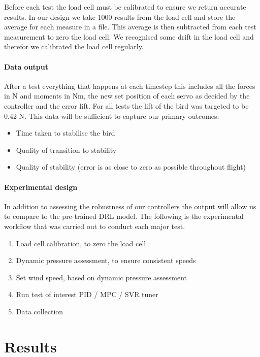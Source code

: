     Before each test the load cell must be calibrated to ensure we return
    accurate results. In our design we take 1000 results from the load cell
    and store the average for each measure in a file. This average is then
    subtracted from each test measurement to zero the load cell. We recognised
    some drift in the load cell and therefor we calibrated the load cell regularly.

    \paragraph{Data output}
    After a test everything that happens at each timestep this includes all the
    forces in N and moments in Nm, the new set position of each servo as decided by
    the controller and the error lift. For all tests the lift of the bird was
    targeted to be 0.42 N. This data will be sufficient to capture our primary outcomes:

    \begin{itemize}
        \item Time taken to stabilise the bird
        \item Quality of transition to stability
        \item Quality of stability (error is as close to zero as possible throughout flight)
    \end{itemize}

    \paragraph{Experimental design} In addition to assessing the robustness of our controllers the output will
    allow us to compare to the pre-trained DRL model.
    The following is the experimental workflow that was carried out to conduct each major test.

    \begin{enumerate}
        \item Load cell calibration, to zero the load cell
        \item Dynamic pressure assessment, to ensure consistent speeds
        \item Set wind speed, based on dynamic pressure assessment
        \item Run test of interest PID / MPC / SVR tuner
        \item Data collection
    \end{enumerate}

\section{Results}


